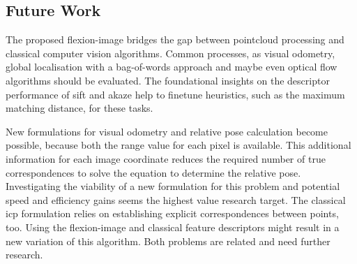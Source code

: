 \subsection{Future Work}

The proposed \gls{flexion-image} bridges the gap between pointcloud processing and classical computer vision algorithms.
Common processes, as visual odometry, global localisation with a bag-of-words approach and maybe even optical flow algorithms should be evaluated.
The foundational insights on the descriptor performance of \acrshort{sift} and \acrshort{akaze} help to finetune heuristics, such as the maximum matching distance, for these tasks.

New formulations for visual odometry and relative pose calculation become possible, because both the range value for each pixel is available.
This additional information for each image coordinate reduces the required number of true correspondences to solve the equation to determine the relative pose.
Investigating the viability of a new formulation for this problem and potential speed and efficiency gains seems the highest value research target.
The classical \acrshort{icp} formulation relies on establishing explicit correspondences between points, too.
Using the \gls{flexion-image} and classical feature descriptors might result in a new variation of this algorithm.
Both problems are related and need further research.
